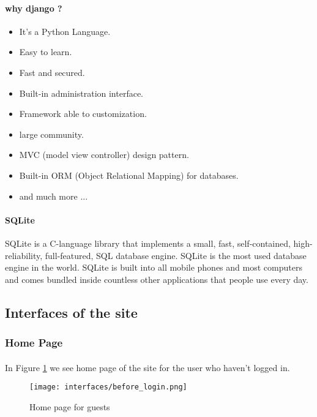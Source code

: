 			\paragraph{why django ?}
			\begin{itemize}
				\item It's a Python Language.
				\item Easy to learn.
				\item Fast and secured.
				\item Built-in administration interface.
				\item Framework able to customization.
				\item large community.
				\item MVC (model view controller) design pattern.
				\item Built-in ORM (Object Relational Mapping) for databases.
				\item and much more ...
			\end{itemize}
		
			\paragraph{SQLite}
			SQLite is a C-language library that implements a small, fast, self-contained, high-reliability, full-featured, SQL database engine. SQLite is the most used database engine in the world. SQLite is built into all mobile phones and most computers and comes bundled inside countless other applications that people use every day.\cite{SQLite}
	\clearpage
	
	\subsection{Interfaces of the site}
	
	\subsubsection{Home Page}
		\paragraph{}
		In Figure \ref{fig:home-before-login} we see home page of the site for the user who haven't logged in.
		
		\begin{figure}[!ht]
			\centering
			\texttt{[image: interfaces/before\_login.png]}
			\caption{Home page for guests}
			\label{fig:home-before-login}
		\end{figure}

